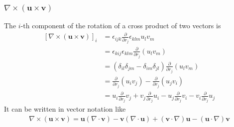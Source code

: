\documentclass[12pt,a4paper,twoside]{book}
\renewcommand{\vec}[1]{\boldsymbol{#1}}
\newcommand{\lra}[1]{ \left( #1 \right) }
\newcommand{\lrb}[1]{ \left[ #1 \right] }
\newcommand{\pd}[1]{\frac{\partial}{\partial #1}}
\begin{document}
\subsubsection{$\nabla \times \lra{\vec{u} \times \vec{v}}$}
The $i$-th component of the rotation of a cross product of two vectors is
\begin{align*}
\lrb{\nabla \times \lra{\vec{u} \times \vec{v}}}_i 
&= \epsilon_{ijk} \pd{r_j} \epsilon_{klm} u_l v_m \\
&= \epsilon_{kij} \epsilon_{klm} \pd{r_j} (u_l v_m) \\
&= (\delta_{il}\delta_{jm}-\delta_{im}\delta_{jl}) \pd{r_j} (u_l v_m) \\
&= \pd{r_j} (u_i v_j) - \pd{r_j} (u_j v_i) \\
&= u_i \pd{r_j} v_j + v_j \pd{r_j} u_i - u_j \pd{r_j} v_i - v_i \pd{r_j} u_j
\end{align*}
It can be written in vector notation like
\begin{align}
\nabla \times \lra{\vec{u} \times \vec{v}} 
= \vec{u} (\nabla \cdot \vec{v}) - \vec{v} (\nabla \cdot \vec{u})
+ (\vec{v} \cdot \nabla) \vec{u} - (\vec{u} \cdot \nabla) \vec{v}
\end{align}

\appendix
%




\end{document}
